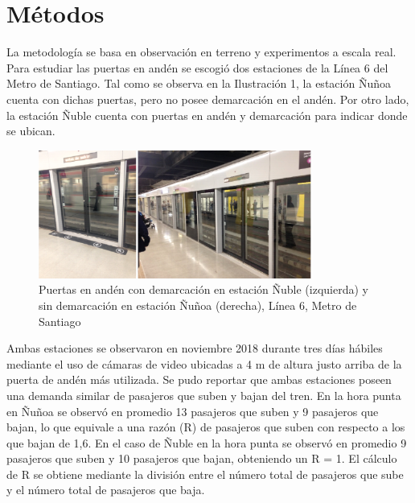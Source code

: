 \section{Métodos}
\label{sec:3}

La metodología se basa en observación en terreno y experimentos a escala real. Para estudiar las puertas en andén se escogió dos estaciones de la Línea 6 del Metro de Santiago. Tal como se observa en la Ilustración 1, la estación Ñuñoa cuenta con dichas puertas, pero no posee demarcación en el andén. Por otro lado, la estación Ñuble cuenta con puertas en andén y demarcación para indicar donde se ubican. 

\begin{figure}[h]
  \centering
  \includegraphics[width=0.8\textwidth]{imagenes/ilustracion_1.png}
  \caption{Puertas en andén con demarcación en estación Ñuble (izquierda) y sin demarcación en estación Ñuñoa (derecha), Línea 6, Metro de Santiago}\label{fig1}
\end{figure}

Ambas estaciones se observaron en noviembre 2018 durante tres días hábiles mediante el uso de cámaras de video ubicadas a 4 m de altura justo arriba de la puerta de andén más utilizada. Se pudo reportar que ambas estaciones poseen una demanda similar de pasajeros que suben y bajan del tren. En la hora punta en Ñuñoa se observó en promedio 13 pasajeros que suben y 9 pasajeros que bajan, lo que equivale a una razón (R) de pasajeros que suben con respecto a los que bajan de 1,6. En el caso de Ñuble en la hora punta se observó en promedio 9 pasajeros que suben y 10 pasajeros que bajan, obteniendo un R = 1. El cálculo de R se obtiene mediante la división entre el número total de pasajeros que sube y el número total de pasajeros que baja.

